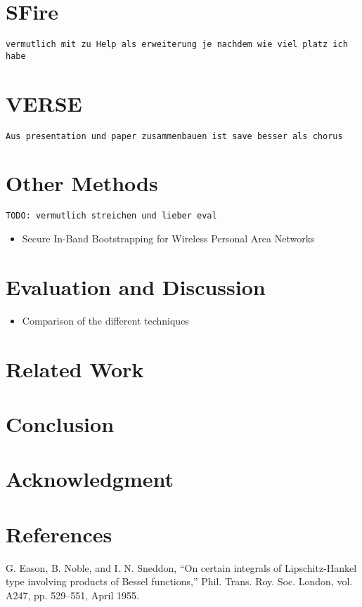 \documentclass[conference]{IEEEtran}
\begin{document}
\section{SFire}

\texttt{vermutlich mit zu Help als erweiterung je nachdem wie viel platz ich habe}

\section{VERSE}
\texttt{Aus presentation und paper zusammenbauen ist save besser als chorus}
\section{Other Methods}
\texttt{TODO: vermutlich streichen und lieber eval}
\begin{itemize}
    \item Secure In-Band Bootstrapping for Wireless Personal Area Networks 
\end{itemize}
\section{Evaluation and Discussion}

\begin{itemize}
    \item Comparison of the different techniques
\end{itemize}

\section{Related Work}

\section{Conclusion}

\section*{Acknowledgment}

\section*{References}


\begin{thebibliography}{00}
 G. Eason, B. Noble, and I. N. Sneddon, ``On certain integrals of Lipschitz-Hankel type involving products of Bessel functions,'' Phil. Trans. Roy. Soc. London, vol. A247, pp. 529--551, April 1955.
\end{thebibliography}
\end{document}

